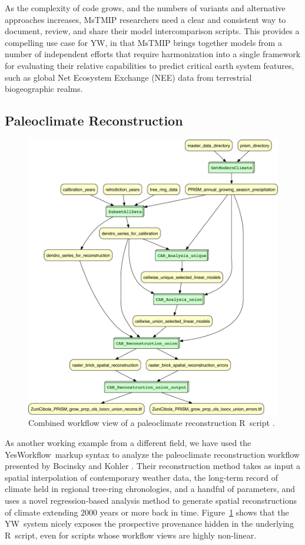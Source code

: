 \documentclass[15]{ijdc-v9}
\newcommand{\YW}{\textsf{YesWorkflow}}
\newcommand{\yw}{\textsf{YW}}
\newcommand{\R}{R}
\newcommand{\figref}[1]{Figure~\ref{#1}}
\begin{document}
As the complexity of code grows, and the numbers of variants and
alternative approaches increases, MsTMIP researchers need a clear and
consistent way to document, review, and share their model
intercomparison scripts. This provides a compelling use case for \yw,
in that MsTMIP brings together models from a number of independent
efforts that require harmonization into a single framework for
evaluating their relative capabilities to predict critical earth
system features, such as global Net Ecosystem Exchange (NEE) data from
terrestrial biogeographic realms.




 \subsection{Paleoclimate Reconstruction}

 \begin{figure}[t]
   \centering
   \includegraphics[width=.7\textwidth]{figures/SKOPE_combined-crop.pdf}
   \caption{Combined workflow view of a paleoclimate reconstruction
     \R\ script \protect\cite{bocinsky2014}.}
   \label{fig-skope}
 \end{figure}

 As another working example from a different field, we have used the
 \YW\ markup syntax to analyze the paleoclimate reconstruction
 workflow presented by Bocinsky and Kohler \cite{bocinsky2014}. Their
 reconstruction method takes as input a spatial interpolation of
 contemporary weather data, the long-term record of climate held in
 regional tree-ring chronologies, and a handful of parameters, and
 uses a novel regression-based analysis method to generate spatial
 reconstructions of climate extending 2000 years or more back in
 time. \figref{fig-skope} shows that the \yw\ system nicely exposes
 the prospective provenance hidden in the underlying \R\ script, even
 for scripts whose workflow views are highly non-linear.
\end{document}
